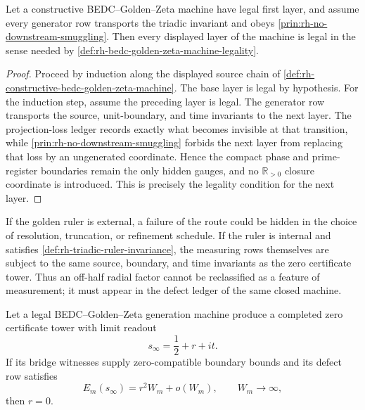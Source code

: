 \begin{theorem}
\label{thm:rh-constructive-layer-discipline-preserves-legality}
Let a constructive BEDC--Golden--Zeta machine have legal first layer,
and assume every generator row transports the triadic invariant and
obeys \autoref{prin:rh-no-downstream-smuggling}.  Then every displayed
layer of the machine is legal in the sense needed by
\autoref{def:rh-bedc-golden-zeta-machine-legality}.
\end{theorem}

\begin{proof}
Proceed by induction along the displayed source chain of
\autoref{def:rh-constructive-bedc-golden-zeta-machine}.  The base layer
is legal by hypothesis.  For the induction step, assume the preceding
layer is legal.  The generator row transports the source, unit-boundary,
and time invariants to the next layer.  The projection-loss ledger
records exactly what becomes invisible at that transition, while
\autoref{prin:rh-no-downstream-smuggling} forbids the next layer from
replacing that loss by an ungenerated coordinate.  Hence the compact
phase and prime-register boundaries remain the only hidden gauges, and
no $\mathbb R_{>0}$ closure coordinate is introduced.  This is precisely
the legality condition for the next layer.
\end{proof}

\begin{principle}
\label{prin:rh-internal-rulers-remove-measurement-escape}
If the golden ruler is external, a failure of the route could be hidden
in the choice of resolution, truncation, or refinement schedule.  If the
ruler is internal and satisfies
\autoref{def:rh-triadic-ruler-invariance}, the measuring rows themselves
are subject to the same source, boundary, and time invariants as the zero
certificate tower.  Thus an off-half radial factor cannot be reclassified
as a feature of measurement; it must appear in the defect ledger of the
same closed machine.
\end{principle}

\begin{theorem}
\label{thm:rh-legal-generation-machines-exclude-radial-limits}
Let a legal BEDC--Golden--Zeta generation machine produce a completed
zero certificate tower with limit readout
$$
s_{\infty}=\frac12+r+it.
$$
If its bridge witnesses supply zero-compatible boundary bounds and its
defect row satisfies
$$
E_m(s_{\infty})=r^2W_m+o(W_m),
\qquad
W_m\to\infty,
$$
then $r=0$.
\end{theorem}

